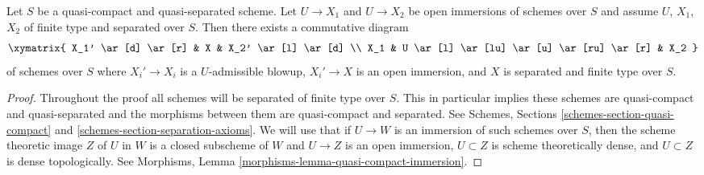 \begin{lemma}
\label{lemma-find-common-blowups}
Let $S$ be a quasi-compact and quasi-separated scheme.
Let $U \to X_1$ and $U \to X_2$ be open immersions
of schemes over $S$ and assume $U$, $X_1$, $X_2$ of finite
type and separated over $S$. Then there exists a commutative diagram
$$
\xymatrix{
X_1' \ar[d] \ar[r] & X & X_2' \ar[l] \ar[d] \\
X_1 & U \ar[l] \ar[lu] \ar[u] \ar[ru] \ar[r] & X_2
}
$$
of schemes over $S$ where $X_i' \to X_i$ is a $U$-admissible
blowup, $X_i' \to X$ is an open immersion, and $X$ is separated and finite
type over $S$.
\end{lemma}

\begin{proof}
Throughout the proof all schemes will be separated of finite type over $S$.
This in particular implies these schemes are quasi-compact and quasi-separated
and the morphisms between them are quasi-compact and separated.
See Schemes, Sections \ref{schemes-section-quasi-compact} and
\ref{schemes-section-separation-axioms}.
We will use that if $U \to W$ is an immersion of such schemes over $S$,
then the scheme theoretic image $Z$ of $U$ in $W$ is a closed subscheme
of $W$ and $U \to Z$ is an open immersion, $U \subset Z$ is scheme
theoretically dense, and $U \subset Z$ is dense topologically. See
Morphisms, Lemma
\ref{morphisms-lemma-quasi-compact-immersion}.


\end{proof}
